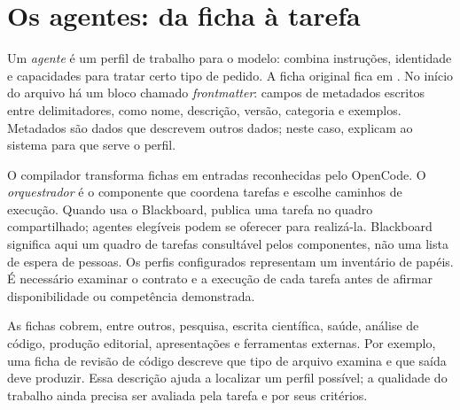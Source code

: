 \clearpage
\section{Os agentes: da ficha à tarefa}


\begin{descricao}
Um \emph{agente} é um perfil de trabalho para o modelo: combina instruções,
identidade e capacidades para tratar certo tipo de pedido. A ficha original
fica em . No início do arquivo há um bloco chamado
\emph{frontmatter}: campos de metadados escritos entre delimitadores, como nome,
descrição, versão, categoria e exemplos. Metadados são dados que descrevem
outros dados; neste caso, explicam ao sistema para que serve o perfil.

O compilador transforma fichas em entradas reconhecidas pelo OpenCode. O
\emph{orquestrador} é o componente que coordena tarefas e escolhe caminhos de
execução. Quando usa o Blackboard, publica uma tarefa no quadro compartilhado;
agentes elegíveis podem se oferecer para realizá-la. Blackboard significa aqui
um quadro de tarefas consultável pelos componentes, não uma lista de espera de
pessoas. Os \CoreAgentCount{} perfis configurados representam um inventário
de papéis. É necessário examinar o contrato e a execução de cada tarefa antes
de afirmar disponibilidade ou competência demonstrada.
\end{descricao}

\begin{resultado}
As fichas cobrem, entre outros, pesquisa, escrita científica, saúde, análise de
código, produção editorial, apresentações e ferramentas externas. Por exemplo,
uma ficha de revisão de código descreve que tipo de arquivo examina e que saída
deve produzir. Essa descrição ajuda a localizar um perfil possível; a qualidade
do trabalho ainda precisa ser avaliada pela tarefa e por seus critérios.
\end{resultado}


